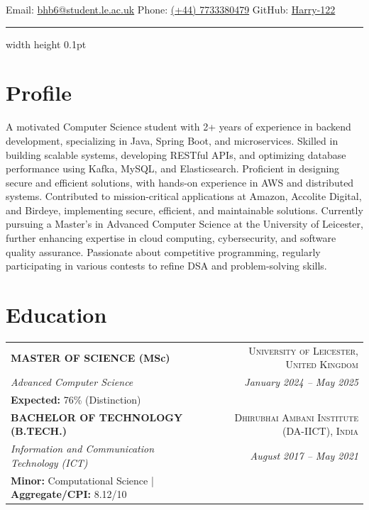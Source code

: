 \documentclass[]{resumebb}
\begin{document}
\thispagestyle{empty} %
{Email: \href{mailto:bhb6@student.le.ac.uk}{bhb6@student.le.ac.uk}}
{Phone: \href{tel:+447733380479}{(+44) 7733380479}}
{GitHub: \href{https://www.github.com/Harry-122}{Harry-122}}

\vspace{-5pt}
\hrule width \textwidth height 0.1pt

\section{\Large Profile}
\sloppy
A motivated Computer Science student with 2+ years of experience in backend development, specializing in Java, Spring Boot, and microservices. Skilled in building scalable systems, developing RESTful APIs, and optimizing database performance using Kafka, MySQL, and Elasticsearch. Proficient in designing secure and efficient solutions, with hands-on experience in AWS and distributed systems. Contributed to mission-critical applications at Amazon, Accolite Digital, and Birdeye, implementing secure, efficient, and maintainable solutions. Currently pursuing a Master’s in Advanced Computer Science at the University of Leicester, further enhancing expertise in cloud computing, cybersecurity, and software quality assurance. Passionate about competitive programming, regularly participating in various contests to refine DSA and problem-solving skills.


\section{\Large Education}
\vspace{-2pt}
\noindent
\begin{tabularx}{\textwidth}{@{}X r@{}}  
    \textbf{\uppercase{Master of Science} (MSc)} & \textsc{University of Leicester, United Kingdom} \\  
    \textit{Advanced Computer Science} & \textit{January 2024 – May 2025} \\
    \textbf{Expected:} 76\% (Distinction)\\
    [0.15cm]  

    \textbf{\uppercase{Bachelor of Technology (B.Tech.)}} & \textsc{Dhirubhai Ambani Institute (DA-IICT), India} \\  
    \textit{Information and Communication Technology (ICT)} & \textit{August 2017 – May 2021} \\  
    \textbf{Minor:} Computational Science \quad | \quad \textbf{Aggregate/CPI:} 8.12/10 \\  
\end{tabularx}
\end{document}
